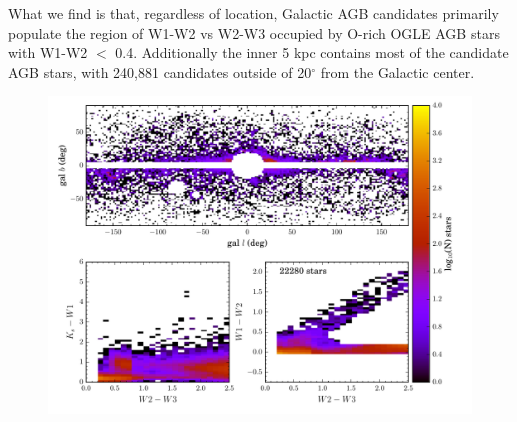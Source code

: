\begin{table}[h]
	\begin{center}
	\caption{$r_\text{GC}$ is the radius from the Galactic center in degrees. \label{tab:region_table}}
	\end{center}
\end{table}



What we find is that, regardless of location, Galactic AGB candidates primarily populate the region of W1-W2 vs W2-W3 occupied by O-rich OGLE AGB stars with W1-W2 $<$ 0.4. Additionally the inner 5 kpc contains most of the candidate AGB stars, with 240,881 candidates outside of 20$^\circ$ from the Galactic  center.
\begin{figure}[h]
\includegraphics[width=6.5in]{figs/color_and_map_candidates_region0.pdf}
\caption{\label{fig:color_map_candidates0}}
\end{figure}

